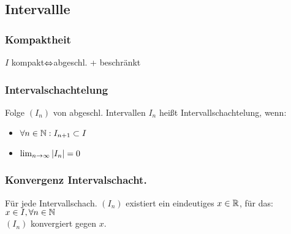 \subsection*{Intervallle}
\subsubsection*{Kompaktheit}
$I$ kompakt$\Leftrightarrow$abgeschl. + beschränkt
\subsubsection*{Intervalschachtelung}
Folge $(I_n)$ von abgeschl. Intervallen $I_n$ heißt Intervallschachtelung, wenn:
\begin{itemize}[noitemsep]
    \item $\forall n \in \mathbb N: I_{n+1} \subset I$
    \item $\lim_{n \rightarrow \infty} |I_n| = 0$
\end{itemize}
\subsubsection*{Konvergenz Intervalschacht.}
Für jede Intervallschach. $(I_n)$ existiert ein eindeutiges $x \in \mathbb R$, für das: $x \in I, \forall n \in \mathbb N$\\
$(I_n)$ konvergiert gegen $x$.
